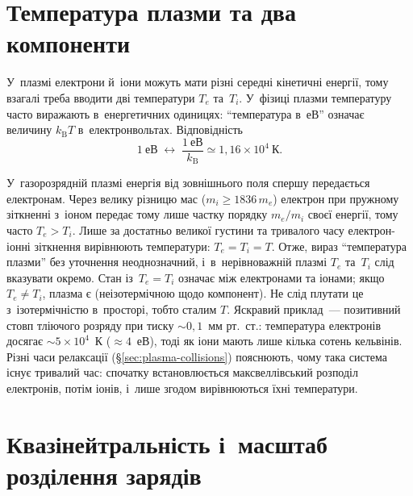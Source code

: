\section{Температура плазми та два компоненти}



У~плазмі електрони й~іони можуть мати різні середні кінетичні енергії, тому взагалі треба
вводити дві температури $T_e$ та~$T_i$. У~фізиці плазми температуру часто виражають
в~енергетичних одиницях: \enquote{температура в~еВ} означає величину $k_{\mathrm B}T$
в~електронвольтах. Відповідність
\begin{equation*}
	1~\text{еВ}\;\longleftrightarrow\;\frac{1~\text{еВ}}{k_{\mathrm B}}\simeq1{,}16\times10^{4}~\text{К}.
\end{equation*}

У~газорозрядній плазмі енергія від зовнішнього поля спершу передається електронам. Через
велику різницю мас ($m_i\geq1836\,m_e$) електрон при пружному зіткненні з~іоном передає
тому лише частку порядку $m_e/m_i$ своєї енергії, тому часто $T_e>T_i$. Лише за достатньо
великої густини та тривалого часу електрон-іонні зіткнення вирівнюють температури:
$T_e=T_i=T$. Отже, вираз \enquote{температура плазми} без уточнення неоднозначний,
і~в~нерівноважній плазмі $T_e$ та~$T_i$ слід вказувати окремо. Стан із~$T_e=T_i$ означає
 між електронами та іонами; якщо $T_e\neq T_i$, плазма є
 (неізотермічною щодо компонент). Не слід плутати це
з~ізотермічністю в~просторі, тобто сталим $T$. Яскравий приклад~--- позитивний стовп
тліючого розряду при тиску $\sim0{,}1$~мм рт.~ст.: температура електронів досягає
$\sim5\times10^4$~К ($\approx4$~еВ), тоді як іони мають лише кілька сотень кельвінів.
Різні часи релаксації (§\ref{sec:plasma-collisions}) пояснюють, чому така система існує
тривалий час: спочатку встановлюється максвеллівський розподіл електронів, потім іонів,
і~лише згодом вирівнюються їхні температури.



\section{Квазінейтральність і~масштаб розділення зарядів}



